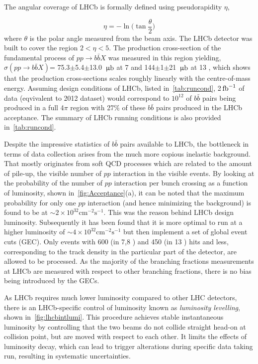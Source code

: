 The angular coverage of \Gls{LHCb} is formally defined using pseudorapidity $\eta$, 

\begin{equation}
	\eta = -\ln \Big(\tan\frac{\theta}{2}\Big)
\end{equation}	
where $\theta$ is the polar angle measured from the beam axis. The \Gls{LHCb} detector was built to cover the region $2<\eta<5$. The production cross-section of the fundamental process of $pp\rightarrow b\bar{b}X$ was measured in this region yielding, $\sigma (pp\rightarrow b\bar{b}X)$= 75.3$\pm$5.4$\pm$13.0 ${\rm \,\upmu b}$ at 7 \tev \cite{LHCb-PAPER-2010-002} and 144$\pm$1$\pm$21 ${\rm \,\upmu b}$ at 13 \tev \cite{LHCb-PAPER-2016-031}, which shows that the production cross-sections scales roughly linearly with the centre-of-mass energy. Assuming design conditions of \gls{LHCb}, listed in~\autoref{tab:runcond}, 2$\mbox{\,fb}^{-1}$ of data (eqvivalent to 2012 dataset) would correspond to $10^{12}$ of $b\bar{b}$ pairs being produced in a full 4$\pi$ region with 27\% of these $b\bar{b}$ pairs produced in the \gls{LHCb} acceptance. The summary of \gls{LHCb} running conditions is also provided in~\autoref{tab:runcond}.

Despite the impressive statistics of $b\bar{b}$ pairs available to \Gls{LHCb}, the bottleneck in terms of data collection arises from the much more copious inelastic background. That mostly originates from soft \gls{QCD} processes which are related to the amount of pile-up, the visible number of $pp$ interaction in the visible events. By looking at the probability of the number of $pp$ interaction per bunch crossing as a function of luminosity, shown in~\autoref{fig:Acceptance}(a), it can be noted that the maximum probability for only one $pp$ interaction (and hence minimizing the background) is found to be at $\sim 2 \times10^{32} \mathrm{cm^{-2} s^{-1}}$.  This was the reason behind \gls{LHCb} design luminosity. Subsequently it has been found that it is more optimal to run at a higher luminosity of $\sim 4 \times10^{32} \mathrm{cm^{-2} s^{-1}}$ but then implement a set of global event cuts (GEC). Only events with 600 (in 7,8 \tev) and 450 (in 13 \tev) hits and less, corresponding to the track density in the particular part of the detector, are allowed to be processed.
As the majority of the branching fractions measurements at \gls{LHCb} are measured with respect to other branching fractions, there is no bias being introduced by the GECs. 

As \Gls{LHCb} requires much lower luminosity compared to other \gls{LHC} detectors, there is an LHCb-specific control of luminosity known as \textit{luminosity levelling}, shown in~\autoref{fig:lhcbintlumi}. This procedure achieves stable instantaneous luminosity by controlling that the two beams do not collide straight head-on at collision point, but are moved with respect to each other. It limits the effects of luminosity decay, which can lead to trigger alterations during specific data taking run, resulting in systematic uncertainties.



